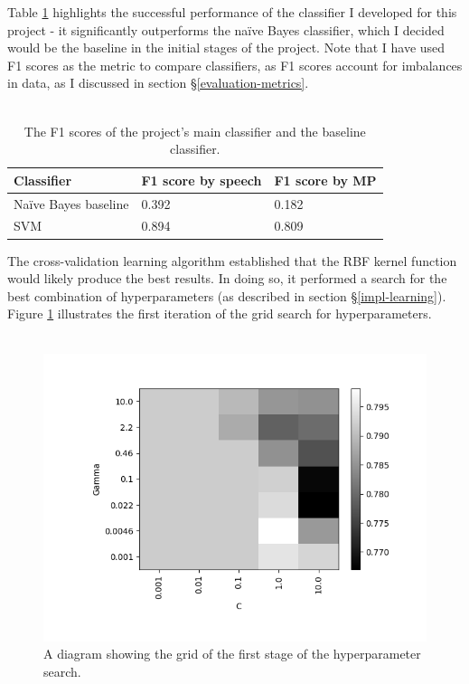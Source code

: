 \documentclass[12pt,a4paper,twoside,openright]{report}
\begin{document}
Table \ref{table:results} highlights the successful performance of the classifier I developed for this project - it significantly outperforms the na\"{i}ve Bayes classifier, which I decided would be the baseline in the initial stages of the project. Note that I have used F1 scores as the metric to compare classifiers, as F1 scores account for imbalances in data, as I discussed in section \S\ref{evaluation-metrics}.
\\\\
\begin{table}[]
	\centering
	\begin{tabular}{lll}
		\hline
		\textbf{Classifier}      & \textbf{F1 score by speech} & \textbf{F1 score by MP} \\ \hline
		Na\"{i}ve Bayes baseline & 0.392                       & 0.182                   \\
		SVM                      & 0.894                       & 0.809                   \\ \hline
	\end{tabular}
	\caption{The F1 scores of the project's main classifier and the baseline classifier.}
	\label{table:results}	
\end{table}

The cross-validation learning algorithm established that the RBF kernel function would likely produce the best results. In doing so, it performed a search for the best combination of hyperparameters (as described in section \S\ref{impl-learning}). Figure \ref{fig:hyperparamgrid} illustrates the first iteration of the grid search for hyperparameters.
\\\\

\begin{figure}
	\begin{center}
		\includegraphics[scale=0.8]{figs/hyperparamgrid.png}
	\end{center}
	\caption{A diagram showing the grid of the first stage of the hyperparameter search.}
	\label{fig:hyperparamgrid}
\end{figure}
\end{document}
